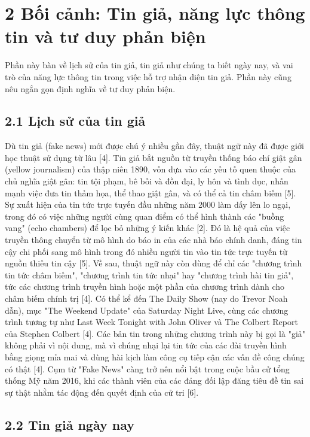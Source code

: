 \section{2 Bối cảnh: Tin giả, năng lực thông tin và tư duy phản biện}

Phần này bàn về lịch sử của tin giả, tin giả như chúng ta biết ngày nay, và vai trò của năng lực thông tin trong việc hỗ trợ nhận diện tin giả. Phần này cũng nêu ngắn gọn định nghĩa về tư duy phản biện.

\subsection{2.1 Lịch sử của tin giả}

Dù tin giả (fake news) mới được chú ý nhiều gần đây, thuật ngữ này đã được giới học thuật sử dụng từ lâu {[}4{]}. Tin giả bắt nguồn từ truyền thống báo chí giật gân (yellow journalism) của thập niên 1890, vốn dựa vào các yếu tố quen thuộc của chủ nghĩa giật gân: tin tội phạm, bê bối và đồn đại, ly hôn và tình dục, nhấn mạnh việc đưa tin thảm họa, thể thao giật gân, và có thể cả tin châm biếm {[}5{]}. Sự xuất hiện của tin tức trực tuyến đầu những năm 2000 làm dấy lên lo ngại, trong đó có việc những người cùng quan điểm có thể hình thành các "buồng vang" (echo chambers) để lọc bỏ những ý kiến khác {[}2{]}. Đó là hệ quả của việc truyền thông chuyển từ mô hình do báo in của các nhà báo chính danh, đáng tin cậy chi phối sang mô hình trong đó nhiều người tin vào tin tức trực tuyến từ nguồn thiếu tin cậy {[}5{]}. Về sau, thuật ngữ này còn dùng để chỉ các "chương trình tin tức châm biếm", "chương trình tin tức nhại" hay "chương trình hài tin giả", tức các chương trình truyền hình hoặc một phần của chương trình dành cho châm biếm chính trị {[}4{]}. Có thể kể đến The Daily Show (nay do Trevor Noah dẫn), mục "The Weekend Update" của Saturday Night Live, cùng các chương trình tương tự như Last Week Tonight with John Oliver và The Colbert Report của Stephen Colbert {[}4{]}. Các bản tin trong những chương trình này bị gọi là "giả" không phải vì nội dung, mà vì chúng nhại lại tin tức của các đài truyền hình bằng giọng mỉa mai và dùng hài kịch làm công cụ tiếp cận các vấn đề công chúng có thật {[}4{]}. Cụm từ "Fake News" càng trở nên nổi bật trong cuộc bầu cử tổng thống Mỹ năm 2016, khi các thành viên của các đảng đối lập đăng tiêu đề tin sai sự thật nhằm tác động đến quyết định của cử tri {[}6{]}.

\subsection{2.2 Tin giả ngày nay}

